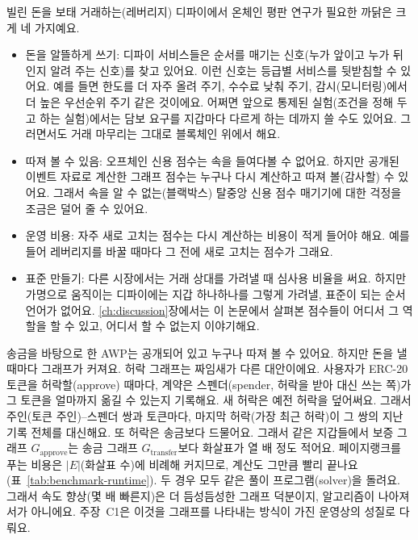 
빌린 돈을 보태 거래하는(레버리지) 디파이에서 온체인 평판 연구가 필요한 까닭은 크게 네 가지예요.
\begin{itemize}
\item 돈을 알뜰하게 쓰기: 디파이 서비스들은 순서를 매기는 신호(누가 앞이고 누가 뒤인지 알려 주는 신호)를 찾고 있어요. 이런 신호는 등급별 서비스를 뒷받침할 수 있어요. 예를 들면 한도를 더 자주 올려 주기, 수수료 낮춰 주기, 감시(모니터링)에서 더 높은 우선순위 주기 같은 것이에요. 어쩌면 앞으로 통제된 실험(조건을 정해 두고 하는 실험)에서는 담보 요구를 지갑마다 다르게 하는 데까지 쓸 수도 있어요. 그러면서도 거래 마무리는 그대로 블록체인 위에서 해요.
\item 따져 볼 수 있음: 오프체인 신용 점수는 속을 들여다볼 수 없어요. 하지만 공개된 이벤트 자료로 계산한 그래프 점수는 누구나 다시 계산하고 따져 볼(감사할) 수 있어요. 그래서 속을 알 수 없는(블랙박스) 탈중앙 신용 점수 매기기에 대한 걱정을 조금은 덜어 줄 수 있어요.
\item 운영 비용: 자주 새로 고치는 점수는 다시 계산하는 비용이 적게 들어야 해요. 예를 들어 레버리지를 바꿀 때마다 그 전에 새로 고치는 점수가 그래요.
\item 표준 만들기: 다른 시장에서는 거래 상대를 가려낼 때 심사용 비율을 써요. 하지만 가명으로 움직이는 디파이에는 지갑 하나하나를 그렇게 가려낼, 표준이 되는 순서 언어가 없어요. \ref{ch:discussion}장에서는 이 논문에서 살펴본 점수들이 어디서 그 역할을 할 수 있고, 어디서 할 수 없는지 이야기해요.
\end{itemize}

송금을 바탕으로 한 AWP는 공개되어 있고 누구나 따져 볼 수 있어요. 하지만 돈을 낼 때마다 그래프가 커져요. 허락 그래프는 짜임새가 다른 대안이에요. 사용자가 ERC-20 토큰을 허락할(approve) 때마다, 계약은 스펜더(spender, 허락을 받아 대신 쓰는 쪽)가 그 토큰을 얼마까지 옮길 수 있는지 기록해요. 새 허락은 예전 허락을 덮어써요. 그래서 주인(토큰 주인)--스펜더 쌍과 토큰마다, 마지막 허락(가장 최근 허락)이 그 쌍의 지난 기록 전체를 대신해요. 또 허락은 송금보다 드물어요. 그래서 같은 지갑들에서 보증 그래프 $G_{\text{approve}}$는 송금 그래프 $G_{\text{transfer}}$보다 화살표가 열 배 정도 적어요. 페이지랭크를 푸는 비용은 $|E|$(화살표 수)에 비례해 커지므로, 계산도 그만큼 빨리 끝나요(표~\ref{tab:benchmark-runtime}). 두 경우 모두 같은 풀이 프로그램(solver)을 돌려요. 그래서 속도 향상(몇 배 빠른지)은 더 듬성듬성한 그래프 덕분이지, 알고리즘이 나아져서가 아니에요. 주장~C1은 이것을 그래프를 나타내는 방식이 가진 운영상의 성질로 다뤄요.

